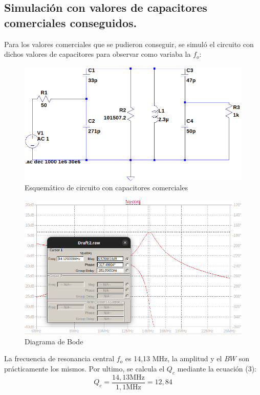\subsection{Simulación con valores de capacitores comerciales conseguidos.}
Para los valores comerciales que se pudieron conseguir, se simuló el circuito con dichos valores de capacitores para observar como variaba la \(f_o\):
\begin{figure}[!h]
    \centering
    \includegraphics[scale=0.4]{Imagenes/Circreal.png}
    \caption{Esquemático de circuito con capacitores comerciales}
    \label{fig:bw}
\end{figure}

\begin{figure}[!h]
    \centering
    \includegraphics[scale=0.4]{Imagenes/Circreal_bode.png}
    \caption{Diagrama de Bode }
    \label{fig:bw}
\end{figure}
La frecuencia de resonancia central \(f_o\) es 14,13 MHz, la amplitud y el \(BW\) son prácticamente los mismos. Por ultimo, se calcula el \(Q_c\) mediante la ecuación (3): 
\begin{equation}
    Q_c = \frac{14,13 \text{MHz}}{1,1 \text{MHz}} = 12,84 
\end{equation}


